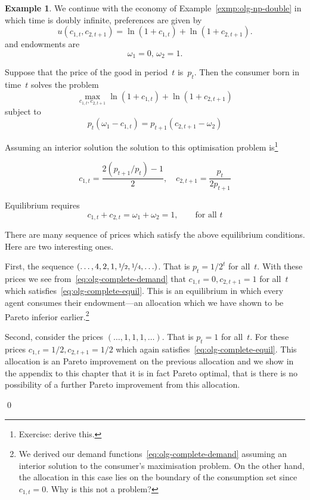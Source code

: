 \documentclass[12pt,reqno,openany]{amsbook}
\theoremstyle{plain}
\theoremstyle{definition}
\newtheorem{exmp}{Example}[chapter]
\begin{document}
\begin{exmp}\label{exmp:olg-complete}
We continue with the economy of Example~\ref{exmp:olg-np-double} in
which time is doubly infinite, preferences are given by
\[u(c_{1,t},c_{2,t+1})=\ln(1+c_{1,t})+\ln(1+c_{2,t+1}).\]
and endowments are
\[\omega_1=0,\, \omega_2=1.\]

Suppose that the price of the good in period~$t$ is~$p_t$. Then the
consumer born in time~$t$ solves the problem
\[\max_{c_{1,t},c_{2,t+1}} \ln(1+c_{1,t})+\ln(1+c_{2,t+1})\]
subject to
\[p_t(\omega_1-c_{1,t})=p_{t+1}(c_{2,t+1}-\omega_2)\]

Assuming an interior solution the solution to this optimisation
problem is\footnote{Exercise: derive this.}

\begin{equation}\label{eq:olg-complete-demand}
c_{1,t}=\frac{2(p_{t+1}/p_t)-1}{2},\quad
c_{2,t+1}=\frac{p_t}{2p_{t+1}}
\end{equation}

Equilibrium requires
\begin{equation}\label{eq:olg-complete-equil}
c_{1,t}+c_{2,t}=\omega_1+\omega_2=1,\qquad \text{for all $t$}
\end{equation}

There are many sequence of prices which satisfy the above equilibrium
conditions. Here are two interesting ones.

First, the sequence $(\ldots,4,2,1,\nicefrac{1}{2},\nicefrac{1}{4},\ldots)$. That is
$p_t=1/2^t$ for all~$t$. With these prices we see
from~\eqref{eq:olg-complete-demand} that $c_{1,t}=0, c_{2,t+1}=1$ for
all~$t$ which satisfies~\eqref{eq:olg-complete-equil}. This is an
equilibrium in which every agent consumes their endowment---an
allocation which we have shown to be Pareto inferior
earlier.\footnote{We derived our demand
  functions~\eqref{eq:olg-complete-demand} assuming an interior
  solution to the consumer's maximisation problem. On the other hand,
  the allocation in this case lies on the boundary of the consumption
  set since $c_{1,t}=0$. Why is this not a problem?}

Second, consider the prices $(\ldots,1,1,1,\ldots)$. That is $p_t=1$
for all~$t$. For these prices $c_{1,t}=1/2, c_{2,t+1}=1/2$ which again
satisfies~\eqref{eq:olg-complete-equil}. This allocation is an Pareto
improvement on the previous allocation and we show in the appendix to
this chapter that it is in fact Pareto optimal, that is there is no
possibility of a further Pareto improvement from this allocation.

\qed
\end{exmp}
\end{document}

